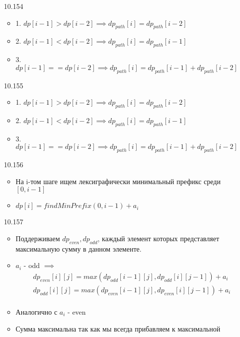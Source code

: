 \documentclass{article}
\begin{document}
\begin{enumerate}
    \item [10.154] 
    \begin{itemize}
        \item 1. $dp[i - 1] > dp[i - 2] \implies dp_{path}[i] = dp_{path}[i-2]$
        \item 2. $dp[i - 1] < dp[i - 2] \implies dp_{path}[i] = dp_{path}[i - 1]$
        \item 3. $dp[i-1] == dp[i-2] \implies dp_{path}[i] = dp_{path}[i-1] + dp_{path}[i-2]$
    \end{itemize}

    \item [10.155] 
    \begin{itemize}
        \item 1. $dp[i - 1] > dp[i - 2] \implies dp_{path}[i] = dp_{path}[i-2]$
        \item 2. $dp[i - 1] < dp[i - 2] \implies dp_{path}[i] = dp_{path}[i - 1]$
        \item 3. $dp[i-1] == dp[i-2] \implies dp_{path}[i] = dp_{path}[i-1] + dp_{path}[i-2]$
    \end{itemize}

    \item [10.156]
    \begin{itemize}
        \item На i-том шаге ищем лексиграфически минимальный префикс среди $[0, i-1]$
        \item $dp[i] = findMinPrefix(0, i - 1) + a_i$
    \end{itemize}

    \item [10.157]
    \begin{itemize}
        \item Поддерживаем $dp_{even}, dp_{odd}$, каждый элемент которых представляет максимальную сумму в данном элементе.
        \item $a_i$ - odd $\implies$ 
        \begin{align*}
             &dp_{even}[i][j] = max(dp_{odd}[i-1][j], dp_{odd}[i][j- 1]) + a_i \\
             &dp_{odd}[i][j] = max(dp_{even}[i-1][j], dp_{even}[i][j-1]) + a_i \\ 
        \end{align*}
        \item Аналогично с $a_i$ - even
        \item Сумма максимальна так как мы всегда прибавляем к максимальной 
    \end{itemize}


\end{enumerate}
\end{document}
